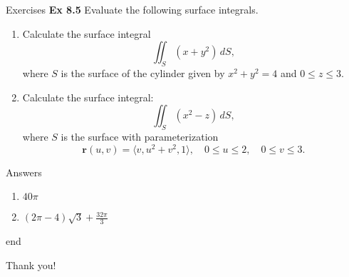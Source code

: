 \documentclass{beamer}
\begin{document}
\begin{frame}{Exercises}
\textbf{Ex 8.5} Evaluate the following surface integrals.
    \begin{enumerate}
    \item
Calculate the surface integral
\[
\iint_S (x + y^2) \, dS,
\]
where \( S \) is the surface of the cylinder given by \( x^2 + y^2 = 4 \) and \( 0 \leq z \leq 3 \).
\item 
Calculate the surface integral:
\[
\iint_S (x^2 - z) \, dS,
\]
where \( S \) is the surface with parameterization
\[
\mathbf{r}(u,v) = \langle v, u^2 + v^2, 1 \rangle, \quad 0 \leq u \leq 2, \quad 0 \leq v \leq 3.
\]

\end{enumerate}
\end{frame}

\begin{frame}{Answers}
    \begin{enumerate}
        \item $40 \pi$
        \item $(2\pi-4)\sqrt{3}+\frac{32\pi}{3}$
    \end{enumerate}
\end{frame}

\begin{frame}{\textcolor{green!30!black}{end}}
    \begin{center}
        \LARGE Thank you!
    \end{center}
\end{frame}
\end{document}
